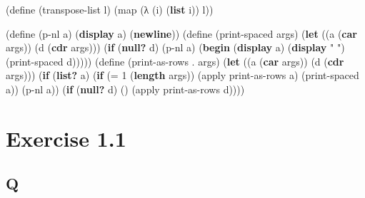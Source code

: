 \documentclass[
]{article}
\newenvironment{Shaded}{}{}
\newcommand{\DecValTok}[1]{\textcolor[rgb]{0.25,0.63,0.44}{#1}}
\newcommand{\ExtensionTok}[1]{#1}
\newcommand{\FunctionTok}[1]{\textcolor[rgb]{0.02,0.16,0.49}{#1}}
\newcommand{\KeywordTok}[1]{\textcolor[rgb]{0.00,0.44,0.13}{\textbf{#1}}}
\newcommand{\NormalTok}[1]{#1}
\newcommand{\OperatorTok}[1]{\textcolor[rgb]{0.40,0.40,0.40}{#1}}
\newcommand{\StringTok}[1]{\textcolor[rgb]{0.25,0.44,0.63}{#1}}
\begin{document}
\hypertarget{transpose-list}{%
\label{transpose-list}}%
\begin{Shaded}
\begin{Highlighting}[]
\NormalTok{(}\ExtensionTok{define}\FunctionTok{ }\NormalTok{(transpose{-}list l)}
\NormalTok{  (map (λ (i) (}\KeywordTok{list}\NormalTok{ i)) l))}
\end{Highlighting}
\end{Shaded}

\hypertarget{print-as-rows}{%
\label{print-as-rows}}%
\begin{Shaded}
\begin{Highlighting}[]
\NormalTok{(}\ExtensionTok{define}\FunctionTok{ }\NormalTok{(p{-}nl a)}
\NormalTok{  (}\KeywordTok{display}\NormalTok{ a)}
\NormalTok{  (}\KeywordTok{newline}\NormalTok{))}
\NormalTok{(}\ExtensionTok{define}\FunctionTok{ }\NormalTok{(print{-}spaced args)}
\NormalTok{  (}\KeywordTok{let}\NormalTok{ ((a (}\KeywordTok{car}\NormalTok{ args))}
\NormalTok{        (d (}\KeywordTok{cdr}\NormalTok{ args)))}
\NormalTok{    (}\KeywordTok{if}\NormalTok{ (}\KeywordTok{null?}\NormalTok{ d)}
\NormalTok{        (p{-}nl a)}
\NormalTok{        (}\KeywordTok{begin}\NormalTok{ (}\KeywordTok{display}\NormalTok{ a)}
\NormalTok{               (}\KeywordTok{display} \StringTok{" "}\NormalTok{)}
\NormalTok{               (print{-}spaced d)))))}
\NormalTok{(}\ExtensionTok{define}\FunctionTok{ }\NormalTok{(print{-}as{-}rows }\OperatorTok{.}\NormalTok{ args)}
\NormalTok{  (}\KeywordTok{let}\NormalTok{ ((a (}\KeywordTok{car}\NormalTok{ args))}
\NormalTok{        (d (}\KeywordTok{cdr}\NormalTok{ args)))}
\NormalTok{    (}\KeywordTok{if}\NormalTok{ (}\KeywordTok{list?}\NormalTok{ a)}
\NormalTok{        (}\KeywordTok{if}\NormalTok{ (}\OperatorTok{=} \DecValTok{1}\NormalTok{ (}\KeywordTok{length}\NormalTok{ args))}
\NormalTok{            (apply print{-}as{-}rows a)}
\NormalTok{            (print{-}spaced a))}
\NormalTok{        (p{-}nl a))}
\NormalTok{    (}\KeywordTok{if}\NormalTok{ (}\KeywordTok{null?}\NormalTok{ d)}
\NormalTok{        \textquotesingle{}()}
\NormalTok{        (apply print{-}as{-}rows d))))}
\end{Highlighting}
\end{Shaded}

\hypertarget{exercise-1.1}{%
\section{Exercise 1.1}\label{exercise-1.1}}

\hypertarget{q}{%
\subsection{Q}\label{q}}
\end{document}
